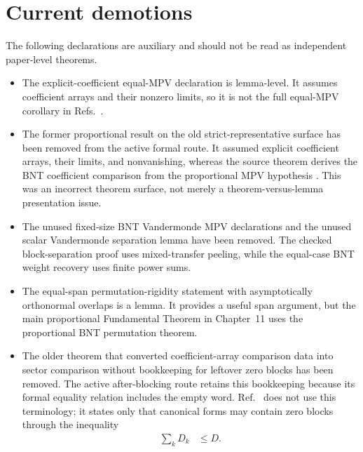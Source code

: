 \documentclass{article}
\begin{document}
\section{Current demotions}

The following declarations are auxiliary and should not be read as independent
paper-level theorems.
\begin{itemize}
    \item The explicit-coefficient equal-MPV declaration
           is
          lemma-level. It assumes coefficient arrays and their nonzero limits,
          so it is not the full equal-MPV corollary in
          Refs.~\cite{Cirac2016MPDO_arXiv,Cirac2021Matrix}.
    \item The former proportional result on the old strict-representative
          surface has been removed from the active formal route. It assumed
          explicit coefficient arrays, their limits, and nonvanishing, whereas
          the source theorem derives the BNT coefficient comparison from the
          proportional MPV hypothesis
          \cite{Cirac2016MPDO_arXiv}. This was an incorrect theorem surface,
          not merely a theorem-versus-lemma presentation issue.
    \item The unused fixed-size BNT Vandermonde MPV declarations and the unused
          scalar Vandermonde separation lemma have been removed. The checked
          block-separation proof uses mixed-transfer peeling, while the
          equal-case BNT weight recovery uses finite power sums.
    \item The equal-span permutation-rigidity statement with asymptotically
          orthonormal overlaps is a lemma. It provides a useful span argument,
          but the main proportional Fundamental Theorem in Chapter~11 uses the
          proportional BNT permutation theorem.
    \item The older theorem that converted coefficient-array comparison data
          into sector comparison without bookkeeping for leftover zero blocks
          has been removed. The active after-blocking route retains this
          bookkeeping because its formal equality relation includes the empty
          word. Ref.~\cite{Cirac2016MPDO_arXiv} does not use this terminology;
          it states only that canonical forms may contain zero blocks through
          the inequality
          \begin{align}
              \sum_k D_k
                  &\leq
                  D.
              \label{eq:tnlean_bnt_ft_theorem_surface_canonical_block_dimension}

\end{align}
\end{itemize}
\end{document}
